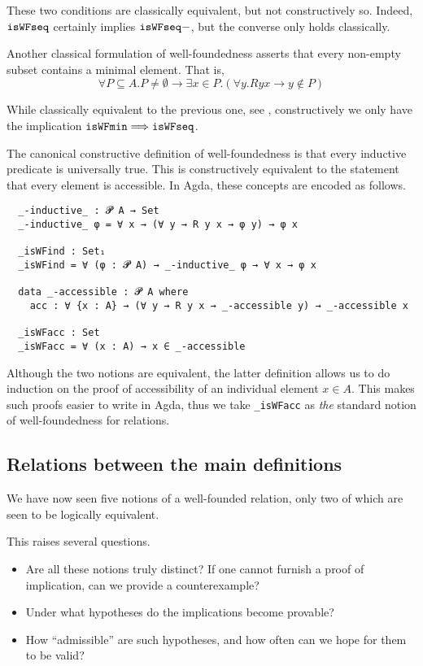These two conditions are classically equivalent, but not constructively so.
Indeed, $\mathtt{isWFseq}$ certainly implies $\mathtt{isWFseq-}$, but the converse only holds classically.

Another classical formulation of well-foundedness
asserts that every non-empty subset
contains a minimal element.  That is,
\[ \tag{$\isWFmin$} \forall P \subseteq A. P \neq \emptyset \to \exists x \in P. (\forall y. Ryx \to y\notin P) \]

While classically equivalent to the previous one, see \cite[Exercise A.1.8]{Terese},
constructively we only have the implication $\mathtt{isWFmin} \Longrightarrow \mathtt{isWFseq}$.

The canonical constructive definition of well-foundedness is that
every inductive predicate is universally true.
This is constructively equivalent to the statement that every element
is accessible.  In Agda, these concepts are encoded as follows.
{\small
\begin{verbatim}
  _-inductive_ : 𝓟 A → Set
  _-inductive_ φ = ∀ x → (∀ y → R y x → φ y) → φ x

  _isWFind : Set₁
  _isWFind = ∀ (φ : 𝓟 A) → _-inductive_ φ → ∀ x → φ x

  data _-accessible : 𝓟 A where
    acc : ∀ {x : A} → (∀ y → R y x → _-accessible y) → _-accessible x

  _isWFacc : Set
  _isWFacc = ∀ (x : A) → x ∈ _-accessible
\end{verbatim}
}
Although the two notions are equivalent, the latter definition allows us to do induction on the proof of accessibility of an individual element $x \in A$.  This makes such proofs easier to write in Agda, thus we take
\verb|_isWFacc| as \emph{the} standard notion of well-foundedness for relations.

\subsection{Relations between the main definitions}

We have now seen five notions of a well-founded relation, only two of which
are seen to be logically equivalent.

This raises several questions.
\begin{itemize}
\item Are all these notions truly distinct?  If one cannot furnish a proof of implication,
can we provide a counterexample?
\item Under what hypotheses do the implications become provable?
\item How ``admissible'' are such hypotheses, and how often can we hope for them to be valid?
\end{itemize}

